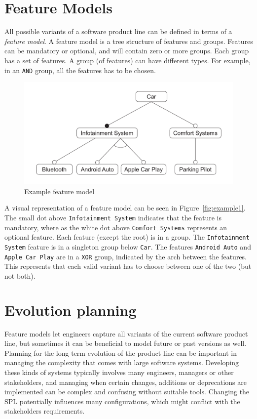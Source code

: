 \documentclass[a4paper,english]{ifimaster}
\begin{document}
\section{Feature Models}%
\label{sec:feature_models}

All possible variants of a software product line can be defined in terms of a \textit{feature model}. A feature model is a tree structure of features and groups. Features can be mandatory or optional, and will contain zero or more groups. Each group has a set of features. A group (of features) can have different types. For example, in an \texttt{AND} group, all the features has to be chosen.

\begin{figure}[htpb]
	\centering
	\includegraphics[width=0.8\linewidth]{illustrations/example.pdf}
	\caption{Example feature model}%
	\label{fig:example1}
\end{figure}

A visual representation of a feature model can be seen in Figure~\vref{fig:example1}. The small dot above \texttt{Infotainment System} indicates that the feature is mandatory, where as the white dot above \texttt{Comfort Systems} represents an optional feature. Each feature (except the root) is in a group. The \texttt{Infotainment System} feature is in a singleton group below \texttt{Car}. The features \texttt{Android Auto} and \texttt{Apple Car Play} are in a \texttt{XOR} group, indicated by the arch between the features. This represents that each valid variant has to choose between one of the two (but not both).

\section{Evolution planning}%
\label{sec:evolution_planning}

Feature models let engineers capture all variants of the current software product line, but sometimes it can be beneficial to model future or past versions as well. Planning for the long term evolution of the product line can be important in managing the complexity that comes with large software systems. Developing these kinds of systems typically involves many engineers, managers or other stakeholders, and managing when certain changes, additions or deprecations are implemented can be complex and confusing without suitable tools. Changing the SPL potentially influences many configurations, which might conflict with the stakeholders requirements.
\end{document}
